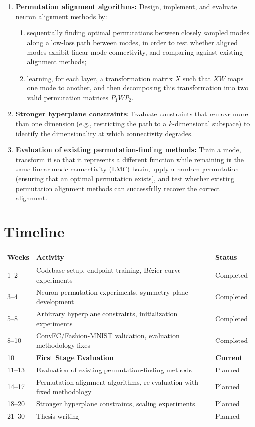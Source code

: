 \documentclass[11pt,a4paper]{article}
\begin{document}
\begin{enumerate}
    \item \textbf{Permutation alignment algorithms:} Design, implement, and evaluate neuron alignment methods by:
    \begin{enumerate}
        \item sequentially finding optimal permutations between closely sampled modes along a low-loss path between modes, in order to test whether aligned modes exhibit linear mode connectivity, and comparing against existing alignment methods;
        \item learning, for each layer, a transformation matrix $X$ such that $XW$ maps one mode to another, and then decomposing this transformation into two valid permutation matrices $P_1 W P_2$.
    \end{enumerate}

    \item \textbf{Stronger hyperplane constraints:} Evaluate constraints that remove more than one dimension (e.g., restricting the path to a $k$-dimensional subspace) to identify the dimensionality at which connectivity degrades.


    \item \textbf{Evaluation of existing permutation-finding methods:} Train a mode, transform it so that it represents a different function while remaining in the same linear mode connectivity (LMC) basin, apply a random permutation (ensuring that an optimal permutation exists), and test whether existing permutation alignment methods can successfully recover the correct alignment.
\end{enumerate}


\section{Timeline}
\begin{table}[H]
\centering
\begin{tabular}{l l l}
\toprule
\textbf{Weeks} & \textbf{Activity} & \textbf{Status} \\
\midrule
1--2 & Codebase setup, endpoint training, B\'{e}zier curve experiments & Completed \\
3--4 & Neuron permutation experiments, symmetry plane development & Completed \\
5--8 & Arbitrary hyperplane constraints, initialization experiments & Completed \\
8--10 & ConvFC/Fashion-MNIST validation, evaluation methodology fixes & Completed \\
10 & \textbf{First Stage Evaluation} & \textbf{Current} \\
\midrule
11--13 & Evaluation of existing permutation-finding methods & Planned \\
14--17 & Permutation alignment algorithms, re-evaluation with fixed methodology & Planned \\
18--20 & Stronger hyperplane constraints, scaling experiments & Planned \\
21--30 & Thesis writing & Planned \\
\bottomrule
\end{tabular}
\end{table}
\end{document}
